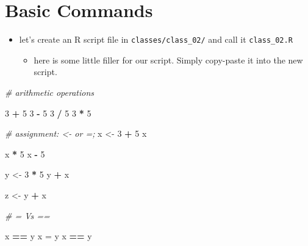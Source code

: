 \documentclass[
]{book}
\newenvironment{Shaded}{\begin{snugshade}}{\end{snugshade}}
\newcommand{\CommentTok}[1]{\textcolor[rgb]{0.56,0.35,0.01}{\textit{#1}}}
\newcommand{\DecValTok}[1]{\textcolor[rgb]{0.00,0.00,0.81}{#1}}
\newcommand{\NormalTok}[1]{#1}
\newcommand{\OtherTok}[1]{\textcolor[rgb]{0.56,0.35,0.01}{#1}}
\newcommand{\SpecialCharTok}[1]{\textcolor[rgb]{0.81,0.36,0.00}{\textbf{#1}}}
\providecommand{\tightlist}{%
  \setlength{\itemsep}{0pt}\setlength{\parskip}{0pt}}
\begin{document}
\hypertarget{basic-commands}{%
\section{Basic Commands}\label{basic-commands}}

\begin{itemize}
\tightlist
\item
  let's create an R script file in \texttt{classes/class\_02/} and call it \texttt{class\_02.R}

  \begin{itemize}
  \tightlist
  \item
    here is some little filler for our script. Simply copy-paste it into the new script.
  \end{itemize}
\end{itemize}

\begin{Shaded}
\begin{Highlighting}[]
\CommentTok{\# arithmetic operations}

\DecValTok{3} \SpecialCharTok{+} \DecValTok{5}
\DecValTok{3} \SpecialCharTok{{-}} \DecValTok{5}
\DecValTok{3} \SpecialCharTok{/} \DecValTok{5}
\DecValTok{3} \SpecialCharTok{*} \DecValTok{5}

\CommentTok{\# assignment: \textasciigrave{}\textless{}{-}\textasciigrave{} or \textasciigrave{}=\textasciigrave{}; }
\NormalTok{x }\OtherTok{\textless{}{-}} \DecValTok{3} \SpecialCharTok{+} \DecValTok{5}
\NormalTok{x}

\NormalTok{x }\SpecialCharTok{*} \DecValTok{5}
\NormalTok{x }\SpecialCharTok{{-}} \DecValTok{5}

\NormalTok{y }\OtherTok{\textless{}{-}} \DecValTok{3} \SpecialCharTok{*} \DecValTok{5}
\NormalTok{y }\SpecialCharTok{+}\NormalTok{ x}

\NormalTok{z }\OtherTok{\textless{}{-}}\NormalTok{ y }\SpecialCharTok{+}\NormalTok{ x}

\CommentTok{\# = Vs ==}

\NormalTok{x }\SpecialCharTok{==}\NormalTok{ y}
\NormalTok{x }\OtherTok{=}\NormalTok{ y}
\NormalTok{x }\SpecialCharTok{==}\NormalTok{ y}
\end{Highlighting}
\end{Shaded}
\end{document}
